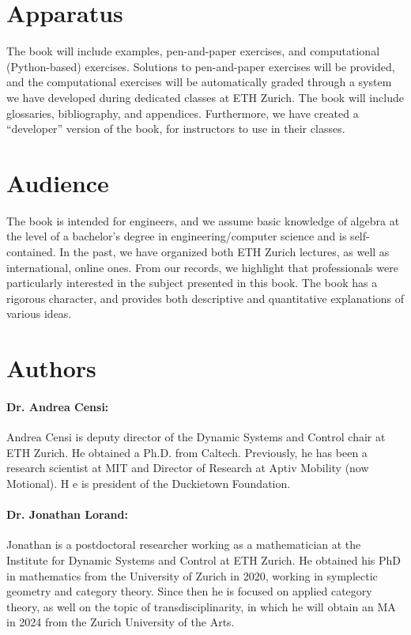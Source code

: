 \documentclass[10pt, article, one side]{memoir}
\begin{document}
    \section{Apparatus}
    The book will include examples, pen-and-paper exercises, and computational (Python-based) exercises.
    Solutions to pen-and-paper exercises will be provided, and the computational exercises will be automatically graded through a system we have developed during dedicated classes at ETH Zurich.
    The book will include glossaries, bibliography, and appendices.
    Furthermore, we have created a “developer” version of the book, for instructors to use in their classes.

    \section{Audience}
    The book is intended for engineers, and we assume basic knowledge of algebra at the level of a bachelor’s degree in engineering/computer science and is self-contained.
    In the past, we have organized both ETH Zurich lectures, as well as international, online ones.
    From our records, we highlight that professionals were particularly interested in the subject presented in this book.
    The book has a rigorous character, and provides both descriptive and quantitative explanations of various ideas.

    \section{Authors}
    \paragraph*{Dr.
        Andrea Censi:} Andrea Censi is deputy director of the Dynamic Systems and Control chair at ETH Zurich.
    He obtained a Ph.D.
    from Caltech.
    Previously, he has been a research scientist at MIT and Director of Research at Aptiv Mobility (now Motional).
    H
    e is president of the Duckietown Foundation.
    \paragraph*{Dr.
        Jonathan Lorand:} Jonathan is a postdoctoral researcher working as a mathematician at the Institute for Dynamic Systems and Control at ETH Zurich.
    He obtained his PhD in mathematics from the University of Zurich in 2020, working in symplectic geometry and category theory.
    Since then he is focused on applied category theory, as well on the topic of transdisciplinarity, in which he will obtain an MA in 2024 from the Zurich University of the Arts.
\end{document}

